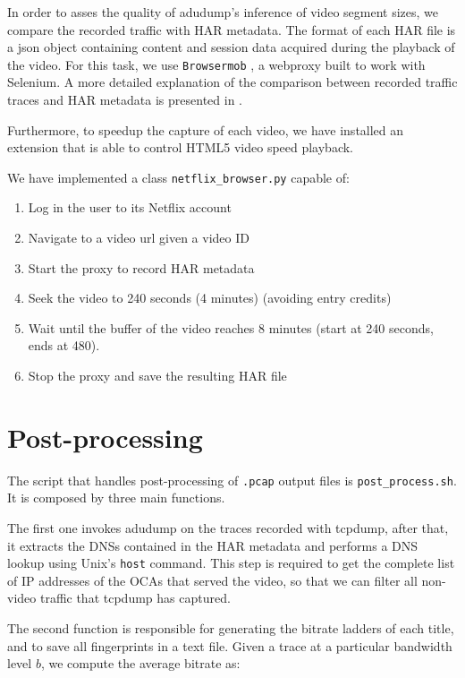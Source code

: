In order to asses the quality of adudump's inference of video segment sizes, we
compare the recorded traffic with HAR \cite{har} metadata. The format of each
HAR file is a json object containing content and session data acquired during
the playback of the video. For this task, we use \texttt{Browsermob}
\cite{browsermob}, a webproxy built to work with Selenium. A more detailed
explanation of the comparison between recorded traffic traces and HAR metadata
is presented in .

Furthermore, to speedup the capture of each video, we have installed an
extension that is able to control HTML5 video speed playback.

We have implemented a class \texttt{netflix\_browser.py} capable of:

\begin{enumerate}
    \item Log in the user to its Netflix account
    \item Navigate to a video url given a video ID
    \item Start the proxy to record HAR metadata
    \item Seek the video to 240 seconds (4 minutes) (avoiding entry credits)
    \item Wait until the buffer of the video reaches 8 minutes (start at 240
        seconds, ends at 480).
    \item Stop the proxy and save the resulting HAR file
\end{enumerate}


\section{Post-processing}

The script that handles post-processing of \texttt{.pcap} output files is
\texttt{post\_process.sh}. It is composed by three main functions.

The first one invokes adudump on the traces recorded with tcpdump, after that,
it extracts the DNSs contained in the HAR metadata and performs a DNS lookup
using Unix's \texttt{host} command. This step is required to get the complete
list of IP addresses of the OCAs that served the video, so that we can filter
all non-video traffic that tcpdump has captured.

The second function is responsible for generating the bitrate ladders of each
title, and to save all fingerprints in a text file. Given a trace at a
particular bandwidth level $b$, we compute the average bitrate as:

